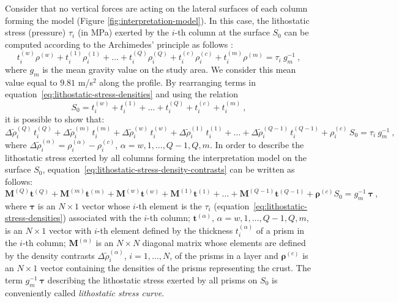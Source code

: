 \documentclass[manuscript,revised]{geophysics}
\begin{document}
Consider that no vertical forces are acting on the lateral surfaces of 
each column forming the model (Figure \ref{fig:interpretation-model}). In this case, 
the lithostatic stress (pressure) $\tau_{i}$ (in MPa) exerted by the $i$-th column at 
the surface $S_{0}$ can be computed according to the Archimedes' principle as follows
\citep[][ p. 129]{turcotte-schubert2002}:
\begin{equation}
t^{(w)}_{i} \rho^{(w)} + t^{(1)}_{i} \rho^{(1)}_{i} + \dots + 
t^{(Q)}_{i} \rho^{(Q)}_{i} + t^{(c)}_{i} \rho^{(c)}_{i} + t^{(m)}_{i} \rho^{(m)} 
= \tau_{i} \: g_{m}^{-1} \: ,
\label{eq:lithostatic-stress-densities}
\end{equation}
where $g_{m}$ is the mean gravity value on the study area. 
We consider this mean value equal to $9.81$ m/s$^{2}$ along the profile.
By rearranging terms in equation~\ref{eq:lithostatic-stress-densities} 
and using the relation
\begin{equation}
S_{0} = t^{(w)}_{i} + t^{(1)}_{i} + \dots + t^{(Q)}_{i} + t^{(c)}_{i} + t^{(m)}_{i} \: ,
\label{eq:S0}
\end{equation}
it is possible to show that:
\begin{equation}
\Delta \tilde{\rho}^{(Q)}_{i} \, t^{(Q)}_{i} + 
\Delta \tilde{\rho}^{(m)}_{i} \, t^{(m)}_{i} + 
\Delta \tilde{\rho}^{(w)}_{i} \, t^{(w)}_{i} + 
\Delta \tilde{\rho}^{(1)}_{i} \, t^{(1)}_{i} +
\dots + 
\Delta \tilde{\rho}^{(Q-1)}_{i} \, t^{(Q-1)}_{i} +
\rho^{(c)}_{i} \, S_{0} = \tau_{i} \: g_{m}^{-1} \: ,
\label{eq:lithostatic-stress-density-contrasts}
\end{equation}
where $\Delta \tilde{\rho}^{(\alpha)}_{i} = \rho^{(\alpha)}_{i} - \rho^{(c)}_{i}$, 
$\alpha = w, 1, \dots, Q-1, Q, m$.
In order to describe the lithostatic stress exerted by all columns forming the
interpretation model on the surface $S_{0}$, 
equation~\ref{eq:lithostatic-stress-density-contrasts} 
can be written as follows:
\begin{equation}
\mathbf{M}^{(Q)} \mathbf{t}^{(Q)} + \mathbf{M}^{(m)} \mathbf{t}^{(m)} + \mathbf{M}^{(w)}
\mathbf{t}^{(w)} + \mathbf{M}^{(1)} \mathbf{t}^{(1)} + \dots + \mathbf{M}^{(Q-1)}
\mathbf{t}^{(Q-1)} + \boldsymbol{\rho}^{(c)} S_{0} = g_{m}^{-1} \: \boldsymbol{\tau} \: ,
\label{eq:lithostatic-stress-matrix}
\end{equation}
where $\boldsymbol{\tau}$ is an $N \times 1$ vector whose $i$-th element is
the $\tau_{i}$ (equation~\ref{eq:lithostatic-stress-densities}) associated with
the $i$-th column; $\mathbf{t}^{(\alpha)}$, $\alpha = w, 1, \dots, Q-1, Q, m$, 
is an $N \times 1$ vector with $i$-th element defined by the thickness 
$t^{(\alpha)}_{i}$ of a prism in the $i$-th column; $\mathbf{M}^{(\alpha)}$ is an $N \times N$ diagonal 
matrix whose elements are defined by the density contrasts 
$\Delta \tilde{\rho}^{(\alpha)}_{i}$, $i = 1, \dots, N$, of the prisms in a layer and
$\boldsymbol{\rho}^{(c)}$ is an $N \times 1$ vector containing the densities of the prisms
representing the crust. The term $g_{m}^{-1} \: \boldsymbol{\tau}$ describing the
lithostatic stress exerted by all prisms on $S_{0}$ is conveniently called
\textit{lithostatic stress curve}.
\end{document}

